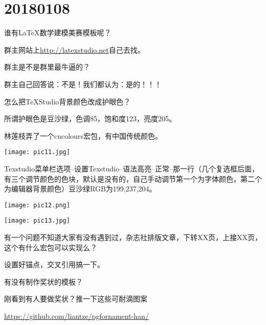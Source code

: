 \documentclass[QAofGroup.tex]{subfiles}
\begin{document}
%
%

\chapter{20180108}\label{ch180108}

\begin{qst}\label{Q2018010801}
谁有\LaTeX{}数学建模美赛模板呢？
\end{qst}
\ans 群主网站上\href{http://www.latexstudio.net/archives/category/latex-templates/mcm-tex-template}{http://latexstudio.net}自己去找。

\begin{qst}\label{Q2018010802}
群主是不是群里最牛逼的？
\end{qst}
\ans 群主自己回答说：不是！\qquad 我们都认为：是的！！！

\begin{qst}\label{Q2018010803}
怎么把TeXStudio背景颜色改成护眼色？
\end{qst}
\ans
所谓护眼色是豆沙绿，色调85，饱和度123，亮度205。

林莲枝弄了一个cncolours宏包，有中国传统颜色。

\texttt{[image: pic11.jpg]}

Texstudio菜单栏选项--设置Texstudio--语法高亮--正常--那一行（几个复选框后面，有三个调节颜色的色块，默认是没有的，自己手动调节第一个为字体颜色，第二个为编辑器背景颜色）豆沙绿RGB为199,237,204。

\texttt{[image: pic12.png]}

\texttt{[image: pic13.jpg]}

\begin{qst}\label{Q2018010804}
有一个问题不知道大家有没有遇到过，杂志社排版文章，下转XX页，上接XX页，这个有什么宏包可以实现么？
\end{qst}
\ans 设置好锚点，交叉引用搞一下。

\begin{qst}\label{Q2018010805}
有没有制作奖状的模板？
\end{qst}
\ans 刚看到有人要做奖状？推一下这些可耐滴图案

 \href{https://github.com/liantze/pgfornament-han/}%
 {https://github.com/liantze/pgfornament-han/}  
 
\end{document}
